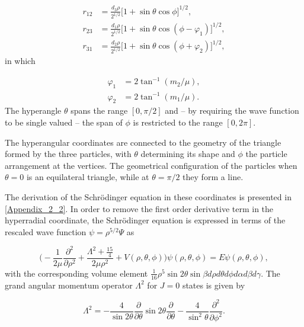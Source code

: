 \begin{equation}
\begin{aligned}
r_{12} &= \frac{d_3\rho}{2^{1/2}}\big[1+\sin\theta\cos\phi\big]^{1/2},\\
r_{23} &= \frac{d_1\rho}{2^{1/2}}\big[1 + \sin\theta\cos(\phi-\varphi_1)\big]^{1/2},\\
r_{31} &= \frac{d_2\rho}{2^{1/2}}\big[1 + \sin\theta\cos(\phi + \varphi_2)\big]^{1/2},
\end{aligned}
\end{equation}
in which

\begin{equation}
\begin{aligned}
\varphi_1 &= 2\tan^{-1}(m_2/\mu),\\
\varphi_2 &= 2\tan^{-1}(m_1/\mu).
\end{aligned}
\end{equation}
The hyperangle $\theta$ spans the range $[0,\pi/2]$ and -- by requiring the wave function to be single valued -- the span of $\phi$ is restricted to the range $[0,2\pi]$. 

The hyperangular coordinates are connected to the geometry of the triangle formed by the three particles, with $\theta$ determining its shape and $\phi$ the particle arrangement at the vertices. The geometrical configuration of the particles when $\theta = 0$ is an equilateral triangle, while at $\theta=\pi/2$ they form a line. 

The derivation of the Schr{\"o}dinger equation in these coordinates is presented in \cref{Appendix_2_2}. In order to remove the first order derivative term in the hyperradial coordinate, the Schr{\"o}dinger equation is expressed in terms of the rescaled wave function $\psi = \rho^{5/2}\Psi$ as

\begin{equation}
 \bigg(-\frac{1}{2 \mu}\frac{\partial^2}{\partial \rho^2} + \frac{ \Lambda^2 + \frac{15}{4}}{2 \mu \rho^{2}}+ V(\rho, \theta, \phi)\bigg)\psi(\rho,\theta,\phi) = E\psi(\rho,\theta,\phi),
\end{equation}
with the corresponding volume element $
\frac{1}{16}\rho^5 \sin 2\theta\sin\beta d\rho d\theta d\phi d\alpha d\beta d\gamma$. The grand angular momentum operator $\Lambda^2$ for $J=0$ states is given by

\begin{equation}\label{eq:grandangularmomentum}
\Lambda^2 = -\frac{4}{\sin 2\theta}\frac{\partial}{\partial \theta}\sin 2\theta \frac{\partial}{\partial \theta} - \frac{4}{\sin^2\theta}\frac{\partial^2}{\partial \phi^2}.
\end{equation}

